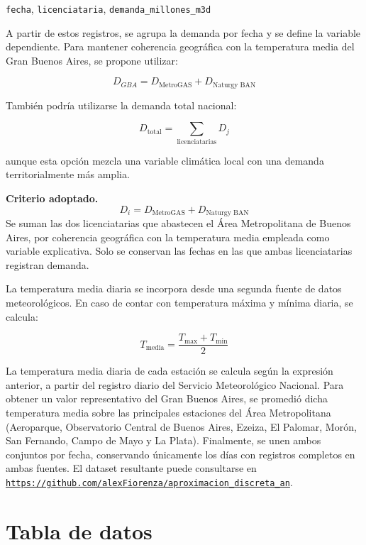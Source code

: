 \documentclass[12pt,a4paper]{article}
\newcommand{\linkRepositorio}{https://github.com/alexFiorenza/aproximacion_discreta_an}
\newcommand{\enlaceRepositorio}{\href{\linkRepositorio}{\nolinkurl{\linkRepositorio}}}
\begin{document}
\begin{center}
\texttt{fecha}, \texttt{licenciataria}, \texttt{demanda\_millones\_m3d}
\end{center}

A partir de estos registros, se agrupa la demanda por fecha y se define la variable dependiente. Para mantener coherencia geográfica con la temperatura media del Gran Buenos Aires, se propone utilizar:

\[
    D_{GBA} = D_{\text{MetroGAS}} + D_{\text{Naturgy BAN}}
\]

También podría utilizarse la demanda total nacional:

\[
    D_{\text{total}} = \sum_{\text{licenciatarias}} D_j
\]

aunque esta opción mezcla una variable climática local con una demanda territorialmente más amplia.

\begin{methodbox}
\textbf{Criterio adoptado.}
\[
    D_i = \boxed{D_{\text{MetroGAS}} + D_{\text{Naturgy BAN}}}
\]
Se suman las dos licenciatarias que abastecen el Área Metropolitana de Buenos Aires, por coherencia geográfica con la temperatura media empleada como variable explicativa. Solo se conservan las fechas en las que ambas licenciatarias registran demanda.
\end{methodbox}

La temperatura media diaria se incorpora desde una segunda fuente de datos meteorológicos. En caso de contar con temperatura máxima y mínima diaria, se calcula:

\[
    T_{\text{media}} = \frac{T_{\max} + T_{\min}}{2}
\]

La temperatura media diaria de cada estación se calcula según la expresión anterior, a partir del registro diario del Servicio Meteorológico Nacional. Para obtener un valor representativo del Gran Buenos Aires, se promedió dicha temperatura media sobre las principales estaciones del Área Metropolitana (Aeroparque, Observatorio Central de Buenos Aires, Ezeiza, El Palomar, Morón, San Fernando, Campo de Mayo y La Plata). Finalmente, se unen ambos conjuntos por fecha, conservando únicamente los días con registros completos en ambas fuentes. El dataset resultante puede consultarse en \enlaceRepositorio{}.

\section{Tabla de datos}
\end{document}
